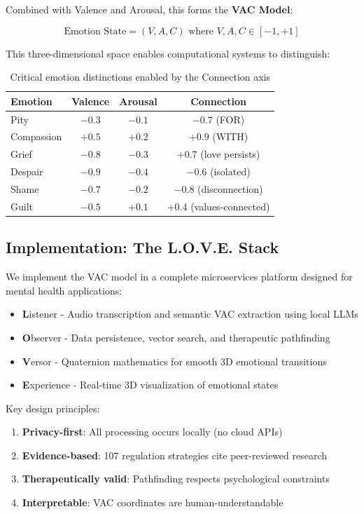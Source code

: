 Combined with Valence and Arousal, this forms the \textbf{VAC Model}:

$$\text{Emotion State} = (V, A, C) \text{ where } V, A, C \in [-1, +1]$$

This three-dimensional space enables computational systems to distinguish:

\begin{table}[h]
\centering
\caption{Critical emotion distinctions enabled by the Connection axis}
\label{tab:emotion-pairs}
\begin{tabular}{lccc}
\toprule
\textbf{Emotion} & \textbf{Valence} & \textbf{Arousal} & \textbf{Connection} \\
\midrule
Pity & $-0.3$ & $-0.1$ & $-0.7$ (FOR) \\
Compassion & $+0.5$ & $+0.2$ & $+0.9$ (WITH) \\
Grief & $-0.8$ & $-0.3$ & $+0.7$ (love persists) \\
Despair & $-0.9$ & $-0.4$ & $-0.6$ (isolated) \\
Shame & $-0.7$ & $-0.2$ & $-0.8$ (disconnection) \\
Guilt & $-0.5$ & $+0.1$ & $+0.4$ (values-connected) \\
\bottomrule
\end{tabular}
\end{table}

\subsection{Implementation: The L.O.V.E. Stack}

We implement the VAC model in a complete microservices platform designed for mental health applications:

\begin{itemize}
    \item \textbf{L}istener - Audio transcription and semantic VAC extraction using local LLMs
    \item \textbf{O}bserver - Data persistence, vector search, and therapeutic pathfinding
    \item \textbf{V}ersor - Quaternion mathematics for smooth 3D emotional transitions
    \item \textbf{E}xperience - Real-time 3D visualization of emotional states
\end{itemize}

Key design principles:
\begin{enumerate}
    \item \textbf{Privacy-first}: All processing occurs locally (no cloud APIs)
    \item \textbf{Evidence-based}: 107 regulation strategies cite peer-reviewed research
    \item \textbf{Therapeutically valid}: Pathfinding respects psychological constraints
    \item \textbf{Interpretable}: VAC coordinates are human-understandable
\end{enumerate}

